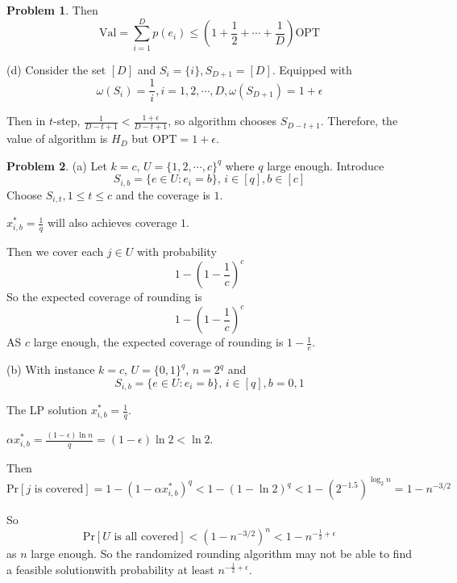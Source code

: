 \documentclass[a4paper]{article}
\theoremstyle{definition}
\newtheorem{problem}{Problem}
\theoremstyle{plain}
\newcommand{\dps}{\displaystyle}
\newcommand{\OPT}{\mathrm{OPT}}
\numberwithin{equation}{problem}
\newcommand{\ie}{ \textit{ i.e. } }
\begin{document}
\begin{problem}
  
  Then 
  \[\mathrm{Val}=\sum_{i=1}^D p(e_i) \leq (1+\frac{1}{2}+\cdots+\frac{1}{D})\OPT\]

  (d) Consider the set  $ [D] $ and  $ S_i=\{i\},S_{D+1}=[D] $. Equipped with 
  \[\omega(S_i)=\frac{1}{i},i=1,2,\cdots, D,\omega(S_{D+1})=1+\epsilon\]

  Then in  $ t $-step,  $ \dps\frac{1}{D-t+1}<\frac{1+\epsilon}{D-t+1} $, so algorithm chooses  $ S_{D-t+1} $. Therefore, the value of algorithm is  $ H_D $ but  $ \OPT=1+\epsilon $.     
\end{problem}

\begin{problem}
  (a) Let  $ k=c $,  $ U=\{1,2,\cdots,c\}^q $ where  $ q $ large enough. Introduce 
  \[S_{i,b}=\{e\in U:e_i=b\}, \,i\in [q],b\in [c]\]
  Choose  $ S_{i,t},1 \leq t \leq c $ and the coverage is  $ 1 $.
  
   $ x_{i,b}^*=\frac{1}{q} $ will also achieves coverage  $ 1 $.  

  Then we cover each  $ j\in U $    with probability 
  \[1-(1-\frac{1}{c})^c\]
  So the expected coverage of rounding is 
  \[1-(1-\frac{1}{c})^c\]
  AS  $ c $ large enough, the expected  coverage of rounding is  $ 1-\frac{1}{e} $.
  
  
  (b) With instance  $ k=c $,  $ U=\{0,1\}^q $,  $ n=2^q $ and 
  \[S_{i,b}=\{e\in U:e_i=b\}, \,i\in [q],b=0,1\]
  
  The LP solution  $ x_{i,b}^*=\frac{1}{q} $. 

   $ \alpha x_{i,b}^*=\frac{(1-\epsilon)\ln n}{q}=(1-\epsilon)\ln 2<\ln 2 $.
   
  Then 
  \[\mathrm{Pr}[j \text{ is covered}]=1-(1-\alpha x_{i,b}^*)^q<1-(1-\ln 2)^q<1-(2^{-1.5})^{\log_2 n}=1-n^{-3/2}\]

  So 
  \[\mathrm{Pr}[U\text{ is all covered}]<(1-n^{-3/2})^n<1-n^{-\frac{1}{2}+\epsilon}\]
  as  $ n $ large enough. So the randomized rounding algorithm may not be able to find a feasible solutionwith probability at least $ n^{-\frac{1}{2}+\epsilon} $. 

\end{problem}
\end{document}
